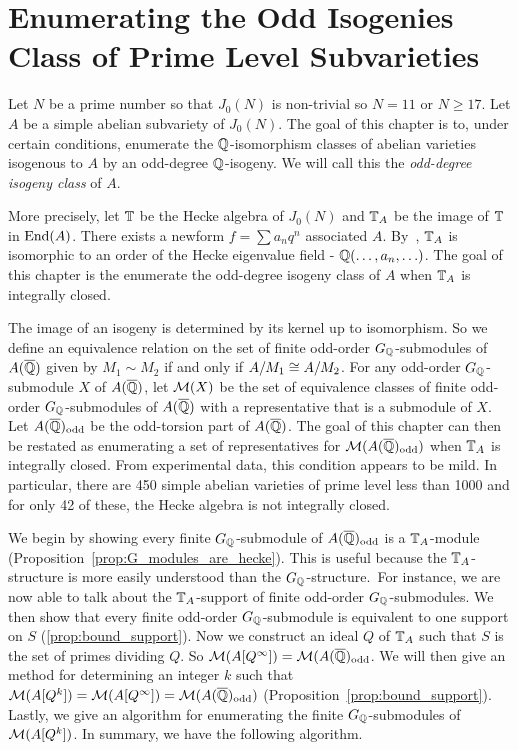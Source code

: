 \chapter{Enumerating the Odd Isogenies Class of Prime Level Subvarieties}%
\label{chap:isogeny_class}

Let $N$ be a prime number so that $J_0(N)$ is non-trivial so $N=11$ or $N\geq
17$. Let $A$ be a simple abelian subvariety of $J_0(N)$. The goal of this
chapter is to, under certain conditions, enumerate the $\mathbb{Q}$-isomorphism
classes of abelian varieties isogenous to $A$ by an odd-degree $\mathbb{Q}$-isogeny.
We will call this the \emph{odd-degree isogeny class} of $A$.

More precisely, let $\mathbb{T}$ be the Hecke algebra of $J_0(N)$ and $\mathbb{T}_A$ be the
image of $\mathbb{T}$ in $\operatorname{End}(A)$. There exists a newform $f=\sum a_n q^n$ associated
$A$. By~\cite[Prop. 7.14]{shimura:intro}, $\mathbb{T}_A$ is isomorphic to an order of
the Hecke eigenvalue field - $\mathbb{Q}(\ldots,a_n,\ldots)$. The goal of this chapter
is the enumerate the odd-degree isogeny class of $A$ when $\mathbb{T}_A$ is integrally
closed.

The image of an isogeny is determined by its kernel up to isomorphism. So we
define an equivalence relation on the set of finite odd-order
$G_{\mathbb{Q}}$-submodules of $A(\overline{\mathbb{Q}})$ given by $M_1\sim M_2$ if and only if
$A/M_1\cong A/M_2$. For any odd-order $G_{\mathbb{Q}}$-submodule $X$ of $A(\overline{\mathbb{Q}})$, let
$\mathcal{M}(X)$ be the set of equivalence classes of finite odd-order
$G_{\mathbb{Q}}$-submodules of $A(\overline{\mathbb{Q}})$ with a representative that is a submodule of
$X$. Let $A(\overline{\mathbb{Q}})_{\mathrm{odd}}$ be the odd-torsion part of $A(\overline{\mathbb{Q}})$. The goal of
this chapter can then be restated as enumerating a set of representatives for
$\mathcal{M}(A(\overline{\mathbb{Q}})_{\mathrm{odd}})$ when $\mathbb{T}_A$ is integrally closed. From experimental data,
this condition appears to be mild. In particular, there are 450 simple abelian
varieties of prime level less than 1000 and for only 42 of these, the Hecke
algebra is not integrally closed.


We begin by showing every finite $G_{\mathbb{Q}}$-submodule of $A(\overline{\mathbb{Q}})_{\mathrm{odd}}$ is a
$\mathbb{T}_A$-module (Proposition~\ref{prop:G_modules_are_hecke}). This is useful
because the $\mathbb{T}_A$-structure is more easily understood than the
$G_{\mathbb{Q}}$-structure.\ For instance, we are now able to talk about the
$\mathbb{T}_A$-support of finite odd-order $G_{\mathbb{Q}}$-submodules. We then show that every
finite odd-order $G_{\mathbb{Q}}$-submodule is equivalent to one support on $S$
(\ref{prop:bound_support}). Now we construct an ideal $Q$ of $\mathbb{T}_A$ such that
$S$ is the set of primes dividing $Q$. So $\mathcal{M}(A[Q^\infty])=\mathcal{M}(A(\overline{\mathbb{Q}})_{\mathrm{odd}}$.
We will then give an method for determining an integer $k$ such that
$\mathcal{M}(A[Q^k])=\mathcal{M}(A[Q^\infty])=\mathcal{M}(A(\overline{\mathbb{Q}})_{\mathrm{odd}})$
(Proposition~\ref{prop:bound_support}). Lastly, we give an algorithm for
enumerating the finite $G_{\mathbb{Q}}$-submodules of $\mathcal{M}(A[Q^k])$. In summary, we have
the following algorithm.

